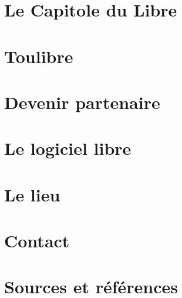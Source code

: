 \documentclass{cdl_sponsor}
\begin{document}

\section{Le Capitole du Libre}

	

\section{Toulibre}

	

\newpage

\section{Devenir partenaire}

	

\newpage

\section{Le logiciel libre}

	

\section{Le lieu}

	
	
\section{Contact}

	

\section{Sources et références}

	
\end{document}
